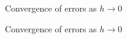 \documentclass{article}
\begin{document}
\begin{figure}[H]
  \begin{center}
  \end{center}
  \caption{Convergence of errors as $h\to 0$}
  \label{fig:mag_susc}
\end{figure}

\begin{figure}[H]
  \begin{center}
  \end{center}
  \caption{Convergence of errors as $h\to 0$}
  \label{fig:mag_susc}
\end{figure}
\end{document}
